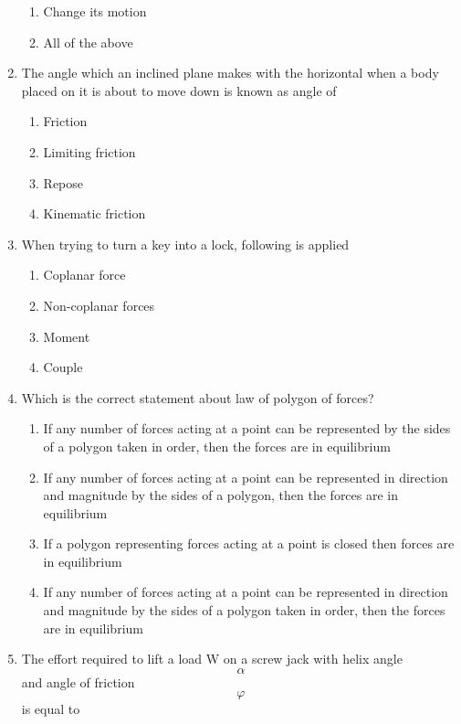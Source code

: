 \documentclass[11pt,a4paper]{article}
\begin{document}
\begin{enumerate}
\begin{enumerate}[label=\Alph*.]
\item{Change its motion}
\item{All of the above}
\end{enumerate}
\item{The angle which an inclined plane makes with the horizontal when a body placed on it is about to move down is known as angle of}
\begin{enumerate}[label=\Alph*.]
\item{Friction}
\item{Limiting friction}
\item{Repose}
\item{Kinematic friction}
\end{enumerate}
\item{When trying to turn a key into a lock, following is applied}
\begin{enumerate}[label=\Alph*.]
\item{Coplanar force}
\item{Non-coplanar forces}
\item{Moment}
\item{Couple}
\end{enumerate}
\item{Which is the correct statement about law of polygon of forces?}
\begin{enumerate}[label=\Alph*.]
\item{If any number of forces acting at a point can be represented by the sides of a polygon taken in order, then the forces are in equilibrium}
\item{If any number of forces acting at a point can be represented in direction and magnitude by the sides of a polygon, then the forces are in equilibrium}
\item{If a polygon representing forces acting at a point is closed then forces are in equilibrium}
\item{If any number of forces acting at a point can be represented in direction and magnitude by the sides of a polygon taken in order, then the forces are in equilibrium}
\end{enumerate}
\item{The effort required to lift a load W on a screw jack with helix angle $$\alpha $$ and angle of friction $$\varphi $$ is equal to}
\\
\end{enumerate}
\end{document}
